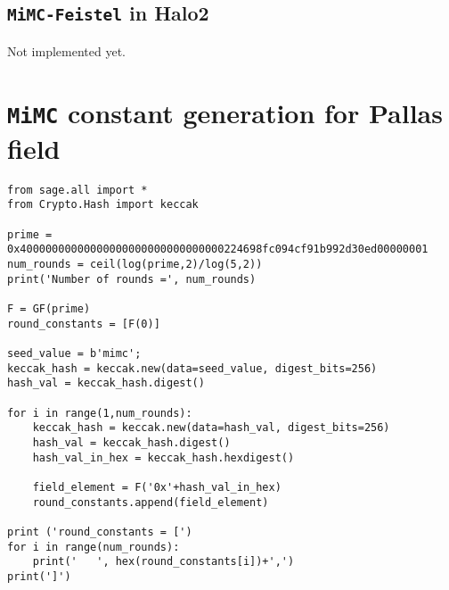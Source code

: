 \documentclass[10pt]{article}
\begin{document}
\subsection{\texttt{MiMC-Feistel} in Halo2}%
\label{subsec:mimc_feistel_in_halo2}
Not implemented yet.






\newpage
\appendix
\section{\texttt{MiMC} constant generation for Pallas field}%
\label{sec:mimc_constant_generation_for_pallas}
\begin{verbatim}
from sage.all import *
from Crypto.Hash import keccak

prime = 0x40000000000000000000000000000000224698fc094cf91b992d30ed00000001
num_rounds = ceil(log(prime,2)/log(5,2))
print('Number of rounds =', num_rounds)

F = GF(prime)
round_constants = [F(0)]

seed_value = b'mimc';
keccak_hash = keccak.new(data=seed_value, digest_bits=256)
hash_val = keccak_hash.digest()

for i in range(1,num_rounds):
    keccak_hash = keccak.new(data=hash_val, digest_bits=256)
    hash_val = keccak_hash.digest()
    hash_val_in_hex = keccak_hash.hexdigest()

    field_element = F('0x'+hash_val_in_hex)
    round_constants.append(field_element)

print ('round_constants = [')
for i in range(num_rounds):
    print('   ', hex(round_constants[i])+',')
print(']')
\end{verbatim}
\end{document}
